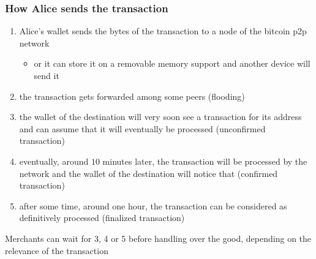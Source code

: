 \documentclass[11pt]{beamer}  %
\begin{document}
\begin{frame}\frametitle{How Alice sends the transaction}

  \begin{enumerate}
  \item Alice's wallet sends the bytes of the transaction to a node of the
    bitcoin p2p network
    \begin{itemize}
    \item or it can store it on a removable memory support and another device
      will send it
    \end{itemize}
  \item the transaction gets forwarded among some peers (flooding)
  \item the wallet of the destination will very soon see a transaction
    for its address and can assume that it will eventually be processed
    (\alert{unconfirmed transaction})
  \item eventually, around $10$ minutes later,
    the transaction will be processed by the network and
    the wallet of the destination will notice that (\alert{confirmed transaction})
  \item after some time, around one hour, the transaction can be considered
    as definitively processed (\alert{finalized transaction})
  \end{enumerate}

  Merchants can wait for 3, 4 or 5 before handling over the good,
  depending on the relevance of the transaction

\end{frame}
\end{document}
